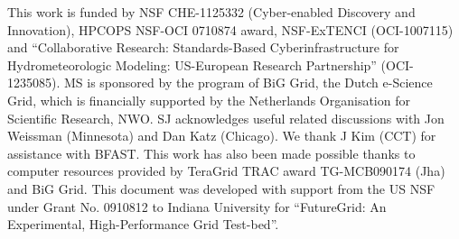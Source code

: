 \documentclass{sig-alternate}
\begin{document}
This work is funded by NSF CHE-1125332
  (Cyber-enabled Discovery and Innovation), HPCOPS NSF-OCI 0710874
  award, NSF-ExTENCI (OCI-1007115) and ``Collaborative Research:
  Standards-Based Cyberinfrastructure for Hydrometeorologic Modeling:
  US-European Research Partnership'' (OCI-1235085).  MS is sponsored
  by the program of BiG Grid, the Dutch e-Science Grid, which is
  financially supported by the Netherlands Organisation for Scientific
  Research, NWO. SJ acknowledges useful related discussions with Jon
  Weissman (Minnesota) and Dan Katz (Chicago). We thank J Kim (CCT)
  for assistance with BFAST.  This work has also been made possible
  thanks to computer resources provided by TeraGrid TRAC award
  TG-MCB090174 (Jha) and BiG Grid.  This document was developed with
  support from the US NSF under Grant No. 0910812 to Indiana
  University for ``FutureGrid: An Experimental, High-Performance Grid
  Test-bed''.

  
% 


\end{document}
